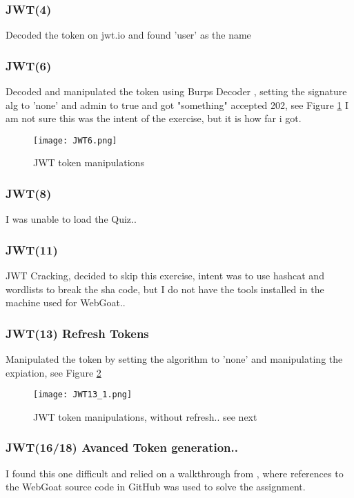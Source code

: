 \documentclass[
	letterpaper, %
	10pt, %
	unnumberedsections, %
	twoside, %
]{APAAssignment}
\begin{document}
\begin{appendices}
\subsubsection{JWT(4)}
Decoded the token on jwt.io and found 'user' as the name

\subsubsection{JWT(6)}
Decoded and manipulated the token using Burps Decoder , setting the signature alg to 'none' and admin to true and got "something" accepted 202, see Figure \ref{fig:app:JWT6} I am not sure this was the intent of the exercise, but it is how far i got.  

\begin{figure}[!ht] %
	\centering
	\texttt{[image: JWT6.png]}
	\caption{JWT token manipulations}
	\label{fig:app:JWT6}
\end{figure}

\subsubsection{JWT(8)}
I was unable to load the Quiz..


\subsubsection{JWT(11)}
JWT Cracking, decided to skip this exercise, intent was to use hashcat and wordlists to break the sha code, but I do not have the tools installed in the machine used for WebGoat.. 


\subsubsection{JWT(13) Refresh Tokens}
Manipulated the token by setting the algorithm to 'none' and manipulating the expiation, see Figure \ref{fig:app:JWT13}

\begin{figure}[!ht] %
	\centering
	\texttt{[image: JWT13\_1.png]}
	\caption{JWT token manipulations, without refresh.. see next}
	\label{fig:app:JWT13}
\end{figure}


\subsubsection{JWT(16/18) Avanced Token generation..}\label{app:JWT1618}
I found this one difficult and relied on a walkthrough from \cite{MediumJWT8}, where references to the WebGoat source code in GitHub was used to solve the assignment. 


\end{appendices}
\end{document}
